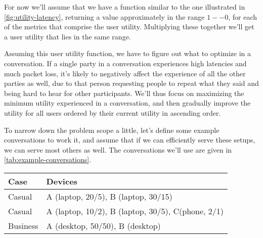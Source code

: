 
For now we'll assume that we have a function similar to the one illustrated in \autoref{fig:utility-latency}, returning a value approximately in the range \(1 -- 0\), for each of the metrics that comprise the user utility. Multiplying these together we'll get a user utility that lies in the same range.

Assuming this user utility function, we have to figure out what to optimize in a conversation. If a single party in a conversation experiences high latencies and much packet loss, it's likely to negatively affect the experience of all the other parties as well, due to that person requesting people to repeat what they said and being hard to hear for other participants. We'll thus focus on maximizing the minimum utility experienced in a conversation, and then gradually improve the utility for all users ordered by their current utility in ascending order.

To narrow down the problem scope a little, let's define some example conversations to work it, and assume that if we can efficiently serve these setups, we can serve most others as well. The conversations we'll use are given in \autoref{tab:example-conversations}.

\begin{center}
    \label{tab:example-conversations}
    \begin{tabular}{| l | l |}
    \hline
    \textbf{Case} & \textbf{Devices} \\ \hline
    Casual & A (laptop, 20/5), B (laptop, 30/15) \\ \hline
    Casual & A (laptop, 10/2), B (laptop, 30/5), C(phone, 2/1) \\ \hline
    Business & A (desktop, 50/50), B (desktop) \\ \hline
    \end{tabular}
\end{center}

